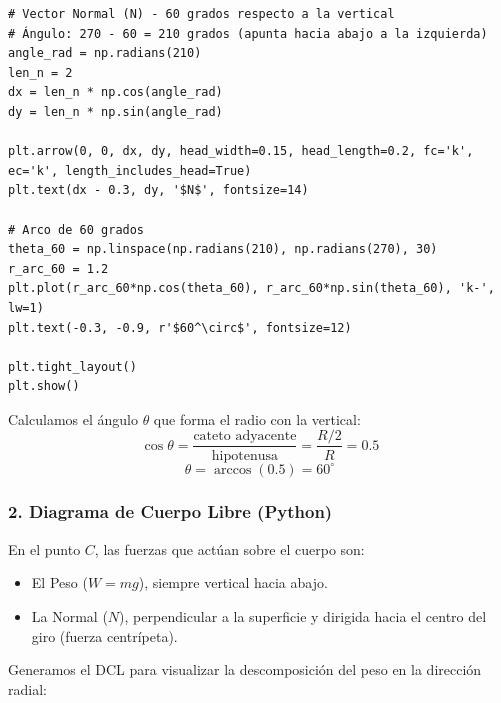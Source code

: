 \documentclass[12pt, a4paper]{article}
\begin{document}
\begin{lstlisting}
# Vector Normal (N) - 60 grados respecto a la vertical
# Ángulo: 270 - 60 = 210 grados (apunta hacia abajo a la izquierda)
angle_rad = np.radians(210)
len_n = 2
dx = len_n * np.cos(angle_rad)
dy = len_n * np.sin(angle_rad)

plt.arrow(0, 0, dx, dy, head_width=0.15, head_length=0.2, fc='k', ec='k', length_includes_head=True)
plt.text(dx - 0.3, dy, '$N$', fontsize=14)

# Arco de 60 grados
theta_60 = np.linspace(np.radians(210), np.radians(270), 30)
r_arc_60 = 1.2
plt.plot(r_arc_60*np.cos(theta_60), r_arc_60*np.sin(theta_60), 'k-', lw=1)
plt.text(-0.3, -0.9, r'$60^\circ$', fontsize=12)

plt.tight_layout()
plt.show()
\end{lstlisting}

Calculamos el ángulo $\theta$ que forma el radio con la vertical:
$$ \cos \theta = \frac{\text{cateto adyacente}}{\text{hipotenusa}} = \frac{R/2}{R} = 0.5 $$
$$ \theta = \arccos(0.5) = 60^\circ $$

\subsubsection*{2. Diagrama de Cuerpo Libre (Python)}
En el punto $C$, las fuerzas que actúan sobre el cuerpo son:
\begin{itemize}
    \item El Peso ($W = mg$), siempre vertical hacia abajo.
    \item La Normal ($N$), perpendicular a la superficie y dirigida hacia el centro del giro (fuerza centrípeta).
\end{itemize}

Generamos el DCL para visualizar la descomposición del peso en la dirección radial:
\end{document}
